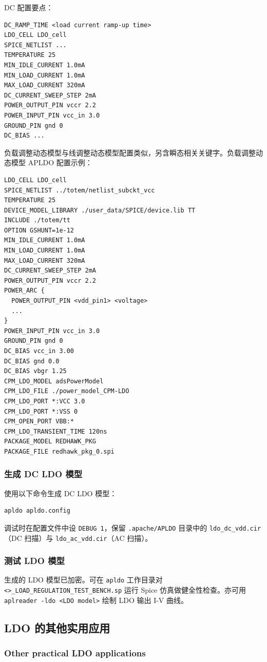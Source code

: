 DC 配置要点：
\begin{lstlisting}
DC_RAMP_TIME <load current ramp-up time>
LDO_CELL LDO_cell
SPICE_NETLIST ...
TEMPERATURE 25
MIN_IDLE_CURRENT 1.0mA
MIN_LOAD_CURRENT 1.0mA
MAX_LOAD_CURRENT 320mA
DC_CURRENT_SWEEP_STEP 2mA
POWER_OUTPUT_PIN vccr 2.2
POWER_INPUT_PIN vcc_in 3.0
GROUND_PIN gnd 0
DC_BIAS ...
\end{lstlisting}

负载调整动态模型与线调整动态模型配置类似，另含瞬态相关关键字。负载调整动态模型 APLDO 配置示例：
\begin{lstlisting}
LDO_CELL LDO_cell
SPICE_NETLIST ../totem/netlist_subckt_vcc
TEMPERATURE 25
DEVICE_MODEL_LIBRARY ./user_data/SPICE/device.lib TT
INCLUDE ./totem/tt
OPTION GSHUNT=1e-12
MIN_IDLE_CURRENT 1.0mA
MIN_LOAD_CURRENT 1.0mA
MAX_LOAD_CURRENT 320mA
DC_CURRENT_SWEEP_STEP 2mA
POWER_OUTPUT_PIN vccr 2.2
POWER_ARC {
  POWER_OUTPUT_PIN <vdd_pin1> <voltage>
  ...
}
POWER_INPUT_PIN vcc_in 3.0
GROUND_PIN gnd 0
DC_BIAS vcc_in 3.00
DC_BIAS gnd 0.0
DC_BIAS vbgr 1.25
CPM_LDO_MODEL adsPowerModel
CPM_LDO_FILE ./power_model_CPM-LDO
CPM_LDO_PORT *:VCC 3.0
CPM_LDO_PORT *:VSS 0
CPM_OPEN_PORT VBB:*
CPM_LDO_TRANSIENT_TIME 120ns
PACKAGE_MODEL REDHAWK_PKG
PACKAGE_FILE redhawk_pkg_0.spi
\end{lstlisting}

\subsubsection{生成 DC LDO 模型}
使用以下命令生成 DC LDO 模型：
\begin{lstlisting}
apldo apldo.config
\end{lstlisting}
调试时在配置文件中设 \texttt{DEBUG 1}，保留 \texttt{.apache/APLDO} 目录中的 \texttt{ldo\_dc\_vdd.cir}（DC 扫描）与 \texttt{ldo\_ac\_vdd.cir}（AC 扫描）。

\subsubsection{测试 LDO 模型}
生成的 LDO 模型已加密。可在 \texttt{apldo} 工作目录对 \texttt{<>_LOAD\_REGULATION\_TEST\_BENCH.sp} 运行 Spice 仿真做健全性检查。亦可用 \texttt{aplreader -ldo <LDO model>} 绘制 LDO 输出 I-V 曲线。

\subsection{LDO 的其他实用应用}
\subsubsection*{Other practical LDO applications}

